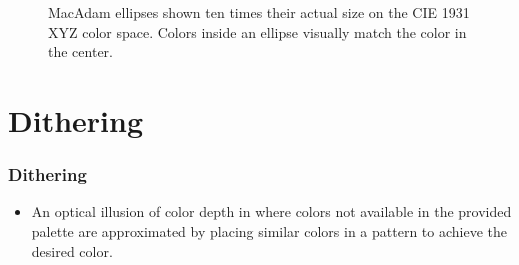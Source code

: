 \documentclass{beamer}
\begin{document}
\begin{frame}
   \begin{figure}[!htbp]
   \begin{center}
   \caption{MacAdam ellipses shown ten times their actual size on the CIE 1931 XYZ color space. Colors inside an ellipse visually match the color in the center.}
   \end{center}
   \end{figure}
\end{frame}

\section{Dithering}

\begin{frame}
   \frametitle{Dithering}
   \begin{itemize}
   \item{An optical illusion of color depth in where colors not available in the provided palette are approximated by placing similar colors in a pattern to achieve the desired color.}
   \end{itemize}
\end{frame}
\end{document}
